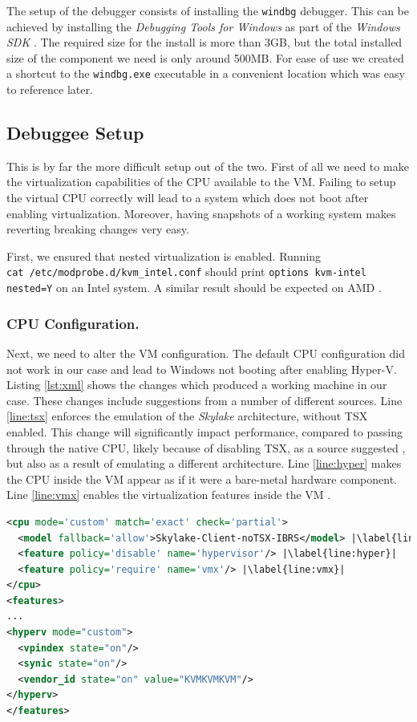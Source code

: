 \documentclass[runningheads]{llncs}
\newcommand{\cc}{\lstinline[mathescape]}
\begin{document}
The setup of the debugger consists of installing the \cc{windbg} debugger. This
can be achieved by installing the \emph{Debugging Tools for Windows} as part of
the \emph{Windows SDK} \cite{debugg}. The required size for the install is more
than 3GB, but the total installed size of the component we need is only around
500MB. For ease of use we created a shortcut to the \cc{windbg.exe} executable
in a convenient location which was easy to reference later.

\subsection{Debuggee Setup}

This is by far the more difficult setup out of the two. First of all we need to 
make the virtualization capabilities of the CPU available to the VM. Failing to
setup the virtual CPU correctly will lead to a system which does not boot after
enabling virtualization. Moreover, having snapshots of a working system makes 
reverting breaking changes very easy. 

First, we ensured that nested virtualization is enabled. Running \\\cc{cat /etc/modprobe.d/kvm_intel.conf} should print \cc{options kvm-intel nested=Y} on an Intel system. A similar result should be expected on AMD \cite{nested-virt}.

\vspace{-3mm} 
\subsubsection{CPU Configuration.} Next, we need to alter the VM
configuration. The default CPU configuration did not work in our case and lead
to Windows not booting after enabling Hyper-V. Listing \ref{lst:xml} shows the
changes which produced a working machine in our case. These changes include
suggestions from a number of different sources. Line \ref{line:tsx} enforces
the emulation of the \emph{Skylake} architecture, without TSX enabled. This
change will significantly impact performance, compared to passing through the
native CPU, likely because of disabling TSX, as a source suggested
\cite{redpill}, but also as a result of emulating a different architecture.
Line \ref{line:hyper} makes the CPU inside the VM appear as if it were a
bare-metal hardware component. Line \ref{line:vmx} enables the virtualization
features inside the VM \cite{super_user} \cite{redpill} \cite{petr}.

\vspace{3mm}
\begin{lstlisting}[language=xml, label={lst:xml},
    caption={Settings necessary for running Hyper-V inside a QEMU/KVM-based
    virtual machine.}]
<cpu mode='custom' match='exact' check='partial'>
  <model fallback='allow'>Skylake-Client-noTSX-IBRS</model> |\label{line:tsx}|
  <feature policy='disable' name='hypervisor'/> |\label{line:hyper}|
  <feature policy='require' name='vmx'/> |\label{line:vmx}|
</cpu>
<features>
...
<hyperv mode="custom">
  <vpindex state="on"/>
  <synic state="on"/>
  <vendor_id state="on" value="KVMKVMKVM"/>
</hyperv>
</features>
\end{lstlisting}
\end{document}
